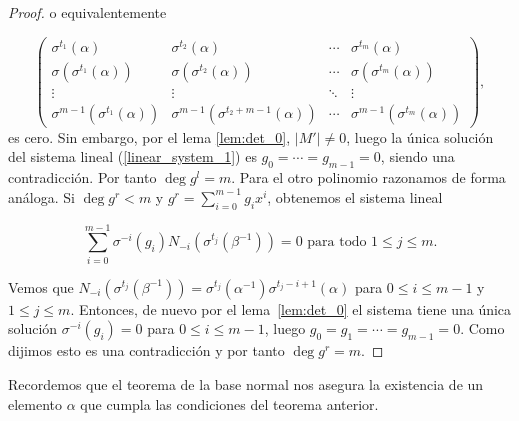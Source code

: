 \begin{proof}
o equivalentemente

\[
\begin{pmatrix}
    \sigma^{t_1}(\alpha) & \sigma^{t_2}(\alpha) & \cdots & \sigma^{t_m}(\alpha) \\
    \sigma(\sigma^{t_1}(\alpha)) & \sigma(\sigma^{t_2}(\alpha)) & \cdots & \sigma(\sigma^{t_m}(\alpha)) \\
    \vdots & \vdots & \ddots & \vdots \\
    \sigma^{m-1}(\sigma^{t_1}(\alpha)) & \sigma^{m-1}(\sigma^{t_2+m-1}(\alpha)) & \cdots & \sigma^{m-1}(\sigma^{t_m}(\alpha))
\end{pmatrix}
,\]
es cero. Sin embargo, por el lema \ref{lem:det_0}, \(|M'| \neq 0\), luego la única solución del sistema lineal (\ref{linear_system_1}) es \(g_0 = \cdots = g_{m-1} = 0\), siendo una contradicción. Por tanto \(\deg g^l = m\). Para el otro polinomio razonamos de forma análoga. Si \(\deg g^r < m\) y \(g^r = \sum_{i=0}^{m-1}g_ix^i\), obtenemos el sistema lineal

\begin{equation}
\label{linear_system_2}
    \sum_{i=0}^{m-1} \sigma^{-i}(g_i)N_{-i}(\sigma^{t_j}(\beta^{-1})) = 0 \text{ para todo } 1 \leq j \leq m.
\end{equation}

Vemos que \(N_{-i}(\sigma^{t_j}(\beta^{-1})) = \sigma^{t_j}(\alpha^{-1})\sigma^{t_j - i + 1}(\alpha)\) para \(0 \leq i \leq m-1\) y \(1 \leq j \leq m\). Entonces, de nuevo por el lema~\ref{lem:det_0} el sistema tiene una única solución \(\sigma^{-i}(g_i) = 0\) para \(0 \leq i \leq m-1\), luego  \(g_0 = g_1 = \cdots = g_{m-1} = 0\). Como dijimos esto es una contradicción y por tanto \(\deg g^r = m\).
\end{proof}

Recordemos que el teorema de la base normal nos asegura la existencia de un elemento \(\alpha\) que cumpla las condiciones del teorema anterior.

